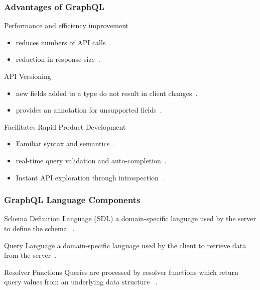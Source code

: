 \begin{frame}\frametitle{Advantages of GraphQL}

\begin{block}{Performance and efficiency improvement}
\begin{itemize}
  \item reduces numbers of API calls~\cite{migrating-to-gql}.
  \item reduction in response size~\cite{migrating-to-gql}.
\end{itemize}
\end{block}

\begin{block}{API Versioning}
\begin{itemize}
  \item new fields added to a type do not result in client changes~\cite{migrating-to-gql}. 
  \item provides an  annotation for unsupported fields~\cite{migrating-to-gql}. 
\end{itemize}

\end{block}

\begin{block}{Facilitates Rapid Product Development}
\begin{itemize}
  \item  Familiar syntax and semantics~\cite{rest-vs-gql-controlled-experiment}.
  \item real-time query validation and auto-completion~\cite{rest-vs-gql-controlled-experiment,migrating-to-gql}.
  \item Instant API exploration through introspection~\cite{migrating-to-gql}. 
\end{itemize}

\end{block}

\end{frame}

\begin{frame}\frametitle{GraphQL Language Components}

\begin{block}{Schema Definition Language (SDL)}
a domain-specific language used by the server to define the schema.~\cite{migrating-to-gql}.
\end{block}

\begin{block}{Query Language}
a domain-specific language used by the client to retrieve data from the server~\cite{initial-analysis-of-gql}. 
\end{block}

\begin{block}{Resolver Functions}
Queries are processed by resolver functions which return query values from an underlying data structure  ~\cite{migrating-to-gql}.
\end{block}

\end{frame}
